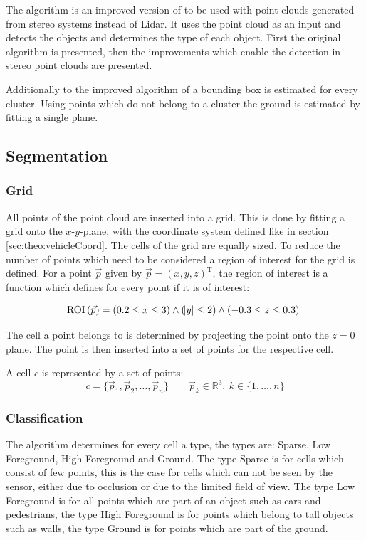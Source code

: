 The algorithm is an improved version of \cite{AttBen17} to be used with point clouds generated from stereo systems instead of Lidar. 
It uses the point cloud as an input and detects the objects and determines the type of each object.
First the original algorithm is presented, then the improvements which enable the detection in stereo point clouds are presented.

Additionally to the improved algorithm of \cite{AttBen17} a bounding box is estimated for every cluster. Using points which do not belong to a cluster the ground is estimated by fitting a single plane.

\subsection{Segmentation}

\subsubsection{Grid}
All points of the point cloud are inserted into a grid. 
This is done by fitting a grid onto the $x$-$y$-plane, with the coordinate system defined like in section \ref{sec:theo:vehicleCoord}. 
The cells of the grid are equally sized. 
To reduce the number of points which need to be considered a region of interest for the grid is defined. 
For a point $\vec{p}$ given by $\vec{p} = {(x,y,z)}^\text{T}$, the region of interest is a function which defines for every
point if it is of interest:

\begin{equation}
    \text{ROI}\, (\vec{p}) = (0.2 \leq x \leq 3) \land (\abs{y} \leq 2) \land (-0.3 \leq z \leq 0.3)
\ \end{equation}

The cell a point belongs to is determined by projecting the point onto the $z=0$ plane. The point is then inserted into a set of points for the respective cell.

A cell $c$ is represented by a set of points:
\begin{equation}
    c = \{\vec{p}_1,\vec{p}_2, \ldots, \vec{p}_n \}\qquad \vec{p}_k \in \mathbb{R}^3,\ k \in \{1, \ldots, n\}
\end{equation}

\subsubsection{Classification}
The algorithm determines for every cell a type, the types are: Sparse, Low Foreground, High Foreground and Ground. 
The type Sparse is for cells which consist of few points, this is the case for cells which can not be seen by the sensor, either due to occlusion or due to the limited field of view.
The type Low Foreground is for all points which are part of an object such as cars and pedestrians, the type High Foreground is for points which belong to tall objects such as walls, the type Ground is for points which are part of the ground.

